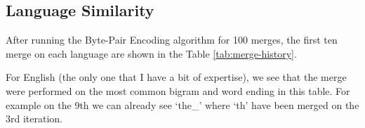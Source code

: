 \subsection{Language Similarity}
After running the Byte-Pair Encoding algorithm for 100 merges, the first ten merge on each language are shown in the Table \ref{tab:merge-history}.
\begin{table}[H]
	\centering
		\caption{Ten first merge on each language}
	\label{tab:merge-history}
\end{table}
For English (the only one that I have a bit of expertise), we see that the merge were performed on the most common bigram and word ending in this table. For example on the 9th we can already see `the\_' where `th' have been merged on the 3rd iteration.



